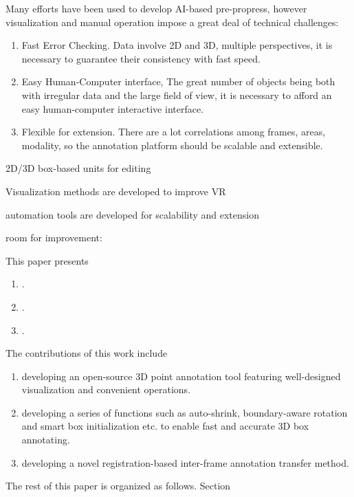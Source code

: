 \documentclass[letterpaper, 10 pt, conference]{ieeeconf}  %
\begin{document}
Many efforts have been used to develop AI-based pre-propress, however
visualization and manual operation impose a great deal of technical challenges:
\begin{enumerate}
\item  Fast Error Checking. Data involve 2D and 3D, multiple perspectives, it is necessary to guarantee their consistency with fast speed.
\item  Easy Human-Computer interface, The great number of objects being both with irregular data and the large field of view, it is necessary to afford an easy human-computer interactive interface. 
\item  Flexible for extension. There are a lot correlations among frames, areas, modality, so the annotation platform should be scalable and extensible.
\end{enumerate}

2D/3D box-based units for editing 

Visualization methods are developed to improve VR

automation tools are developed for scalability and extension 

room for improvement: 

This paper presents 
\begin{enumerate}
	
	\item.
	\item.
	\item.
	
\end{enumerate}

The contributions of this work include
\begin{enumerate}

	\item developing an open-source 3D point annotation tool featuring  well-designed visualization and convenient operations.
	\item developing a series of functions such as auto-shrink, boundary-aware rotation and smart box initialization etc. to enable fast and accurate 3D box annotating.
	\item developing a novel registration-based inter-frame annotation transfer method.
\end{enumerate}

The rest of this paper is organized as follows. Section
\end{document}
